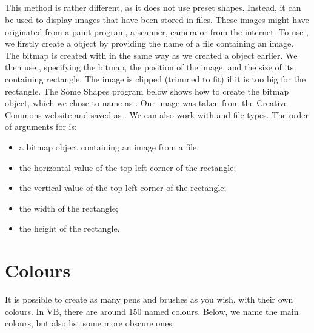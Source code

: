 		\subsection*{}
			This method is rather different, as it does not use preset shapes. Instead, it can be used to display images that have been stored in files. These images might have originated from a paint program, a scanner, camera or from the internet. To use , we firstly create a  object by providing the name of a file containing an image. The bitmap is created with  in the same way as we created a  object earlier. We then use , specifying the bitmap, the position of the image, and the size of its containing rectangle. The image is clipped (trimmed to fit) if it is too big for the rectangle. The Some Shapes program below shows how to create the bitmap object, which we chose to name as . Our image was taken from the Creative Commons website and saved as . We can also work with  and  file types.
The 	order of arguments for  is:
		\begin{itemize}
			\item a bitmap object containing an image from a file.
			\item the horizontal value of the top left corner of the rectangle;
			\item the vertical value of the top left corner of the rectangle;
			\item the width of the rectangle;
			\item the height of the rectangle.
		\end{itemize}

	\section{Colours}
		It is possible to create as many pens and brushes as you wish, with their own colours. In VB, there are around 150 named colours. Below, we name the main colours, but also list some more obscure ones:
		\begin{center}
		\end{center}

